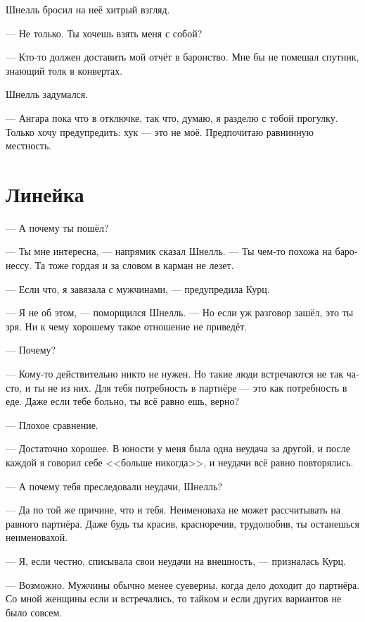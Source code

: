 \documentclass[a4paper,12pt,fleqn]{book}\usepackage{polyglossia}\setdefaultlanguage[babelshorthands=true]{russian}\setotherlanguage{english}\defaultfontfeatures{Ligatures=TeX,Mapping=tex-text}\usepackage{xcolor}\newcommand{\ml}[3]{#2}
\begin{document}
Шнелль бросил на неё хитрый взгляд.

\ml{$0$}
{--- Не только.}
{``Not only.}
\ml{$0$}
{Ты хочешь взять меня с собой?}
{Do you want me to go with you?''}

--- Кто-то должен доставить мой отчёт в баронство.
\ml{$0$}
{Мне бы не помешал спутник, знающий толк в конвертах.}
{I could use a companion who knows envelopes.''}

Шнелль задумался.

--- Ангара пока что в отключке, так что, думаю, я разделю с тобой прогулку.
\ml{$0$}
{Только хочу предупредить: хук --- это не моё.}
{Just a fair warning: hook is not my piece of pie.}
\ml{$0$}
{Предпочитаю равнинную местность.}
{I prefer flat terrain.''}

\section{Линейка}

--- А почему ты пошёл?

--- Ты мне интересна, --- напрямик сказал Шнелль.
--- Ты чем-то похожа на баронессу.
Та тоже гордая и за словом в карман не лезет.

--- Если что, я завязала с мужчинами, --- предупредила Курц.

--- Я не об этом, --- поморщился Шнелль.
--- Но если уж разговор зашёл, это ты зря.
Ни к чему хорошему такое отношение не приведёт.

--- Почему?

--- Кому-то действительно никто не нужен.
Но такие люди встречаются не так часто, и ты не из них.
Для тебя потребность в партнёре --- это как потребность в еде.
Даже если тебе больно, ты всё равно ешь, верно?

--- Плохое сравнение.

--- Достаточно хорошее.
В юности у меня была одна неудача за другой, и после каждой я говорил себе <<больше никогда>>, и неудачи всё равно повторялись.

--- А почему тебя преследовали неудачи, Шнелль?

--- Да по той же причине, что и тебя.
Неименоваха не может рассчитывать на равного партнёра.
Даже будь ты красив, красноречив, трудолюбив, ты останешься неименовахой.

--- Я, если честно, списывала свои неудачи на внешность, --- призналась Курц.

--- Возможно.
Мужчины обычно менее суеверны, когда дело доходит до партнёра.
Со мной женщины если и встречались, то тайком и если других вариантов не было совсем.
\end{document}
